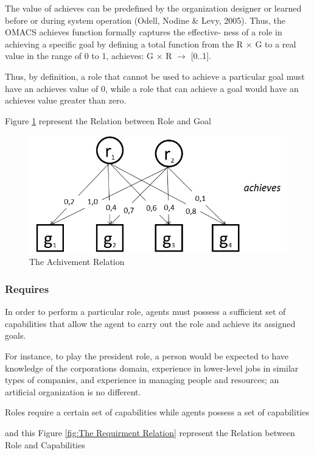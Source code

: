  The value of achieves can be predefined by the organization designer or learned before or during system operation (Odell, Nodine \& Levy, 2005). Thus, the OMACS achieves function formally captures the effective- ness of a role in achieving a specific goal by defining a total function from the R $\times$ G to a real value in the range of 0 to 1, achieves: G $\times$ R $\rightarrow$ {[}0..1{]}.
 
  Thus, by definition, a role that cannot be used to achieve a particular goal must have an achieves value of 0, while a role that can achieve a goal would have an achieves value greater than zero.\cite{omacs4}

Figure \ref{fig:The Achivement Relation} represent the Relation between Role and Goal  
\begin{figure}[th]
	\centering
		\includegraphics[scale=0.5]{chapiter1/img/RelAchieve}
	\caption{\label{fig:The Achivement Relation}The Achivement Relation }
\end{figure} 
 

\subsubsection{Requires}

In order to perform a particular role, agents must possess a sufficient set of capabilities that allow
the agent to carry out the role and achieve its assigned goals. \cite{omacs2}

For instance, to play the  president role,
 a person would be expected to have knowledge of the corporations domain, experience in
lower-level jobs in similar types of companies, and experience in managing people and resources;
an artificial organization is no different. 

Roles require a certain set of capabilities while agents
possess a set of capabilities \cite{omacs2}


and this Figure \ref{fig:The Requirment Relation} represent the Relation between Role and Capabilities 

